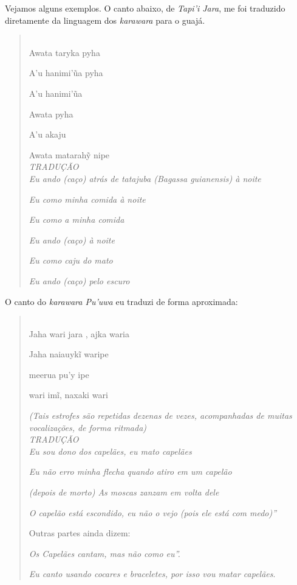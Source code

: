 Vejamos alguns exemplos. O canto abaixo, de \emph{Tapi'i Jara}, me foi
traduzido diretamente da linguagem dos \emph{karawara} para o guajá.

\begin{quote}
\forceindent
{} \\

Awata taryka pyha

A'u hanimi'ũa pyha

A'u hanimi'ũa

Awata pyha

A'u akaju

Awata matarahỹ nipe\\

\emph{TRADUÇÃO}\\

\emph{Eu ando (caço) atrás de tatajuba (\emph{Bagassa guianensis}) à noite}

\emph{Eu como minha comida à noite}

\emph{Eu como a minha comida}

\emph{Eu ando (caço) à noite}

\emph{Eu como caju do mato}

\emph{Eu ando (caço) pelo escuro}
\end{quote}

O canto do \emph{karawara Pu'uwa} eu traduzi de forma aproximada:

\pagebreak
\begin{quote}
\forceindent
{} \\

Jaha wari jara , ajka waria
 
 Jaha naiauykĩ waripe
 
 meerua pu'y ipe
 
 wari imĩ, naxaki wari

\emph{(Tais estrofes são repetidas dezenas de vezes, acompanhadas de muitas
vocalizações, de forma ritmada)}\\

\emph{TRADUÇÃO}\\

\emph{Eu sou dono dos capelães, eu mato capelães}

\emph{Eu não erro minha flecha quando atiro em um capelão}

\emph{(depois de morto) As moscas zanzam em volta dele}

\emph{O capelão está escondido, eu não o vejo (pois ele está com medo)''}

Outras partes ainda dizem:

\emph{Os Capelães cantam, mas não como eu''.}

\emph{Eu canto usando cocares e braceletes, por isso vou matar capelães}.
\end{quote}

